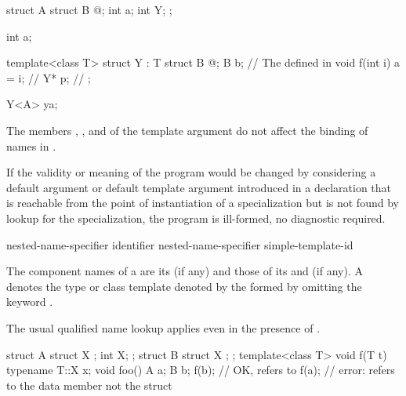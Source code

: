 \begin{example}
\begin{codeblock}
struct A {
  struct B { @\commentellip@ };
  int a;
  int Y;
};

int a;

template<class T> struct Y : T {
  struct B { @\commentellip@ };
  B b;                          // The  defined in 
  void f(int i) { a = i; }      // 
  Y* p;                         // 
};

Y<A> ya;
\end{codeblock}

The members , , and 
of the template argument 
do not affect the binding of names in .
\end{example}

\pnum
If the validity or meaning of the program would be changed by
considering a default argument or default template argument
introduced in a declaration that is reachable from
the point of instantiation of a specialization
but is not found by lookup for the specialization,
the program is ill-formed, no diagnostic required.

\begin{bnf}
\br
   nested-name-specifier identifier\br
   nested-name-specifier  simple-template-id
\end{bnf}

\pnum
{}%
The component names of a  are
its  (if any) and
those of its  and
 (if any).
A 
denotes the type or class template
denoted by the 
formed by omitting the keyword .
\begin{note}
The usual qualified name lookup applies
even in the presence of .
\end{note}
\begin{example}
\begin{codeblock}
struct A {
  struct X { };
  int X;
};
struct B {
  struct X { };
};
template<class T> void f(T t) {
  typename T::X x;
}
void foo() {
  A a;
  B b;
  f(b);             // OK,  refers to 
  f(a);             // error:  refers to the data member  not the struct 
}
\end{codeblock}
\end{example}

